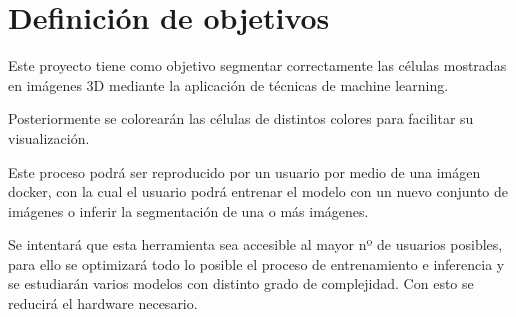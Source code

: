 \chapter{Definici\'on de objetivos}\label{defobjetivos}

Este proyecto tiene como objetivo segmentar correctamente las células mostradas en imágenes 3D mediante la aplicación de técnicas de machine learning.

Posteriormente se colorearán las células de distintos colores para facilitar su visualización.

Este proceso podrá ser reproducido por un usuario por medio de una imágen docker, con la cual el usuario podrá entrenar el modelo con un nuevo conjunto de imágenes o inferir la segmentación de una o más imágenes.

Se intentará que esta herramienta sea accesible al mayor nº de usuarios posibles, para ello se optimizará todo lo posible el proceso de entrenamiento e inferencia y se estudiarán varios modelos con distinto grado de complejidad. Con esto se reducirá el hardware necesario.